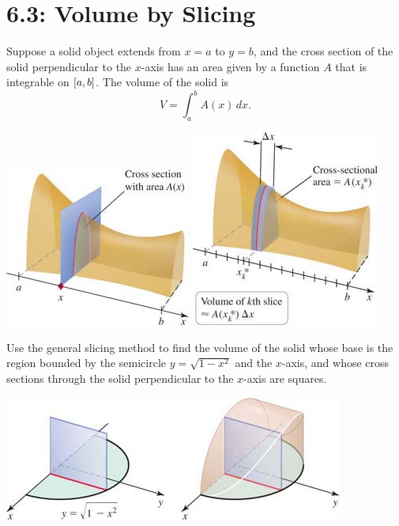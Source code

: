 \documentclass[../mathNotesPreamble]{subfiles}
\begin{document}
  \section{6.3: Volume by Slicing}

  \begin{thmBox*}
    Suppose a solid object extends from $x=a$ to $y=b$, and the cross section of the solid perpendicular to the $x$-axis has an area given by a function $A$ that is integrable on ${\left[a,b\right]}$. The volume of the solid is
      \[V=\int_a^b A(x)\,dx.\]
  \end{thmBox*}
  \begin{center}
    \includegraphics[width=0.22\linewidth]{../images/briggs_06_03/fig06_22}
    \hspace*{0.15\linewidth}
    \includegraphics[width=0.22\linewidth]{../images/briggs_06_03/fig06_23}
  \end{center}

  \begin{ex*}
    Use the general slicing method to find the volume of the solid whose base is the region bounded by the semicircle $y=\sqrt{1-x^2}$ and the $x$-axis, and whose cross sections through the solid perpendicular to the $x$-axis are squares.
  \end{ex*}
  
  \begin{flushright}
    \includegraphics[width=0.4\linewidth]{../images/briggs_06_03/prac06_11}
  \end{flushright}
  \pagebreak
\end{document}

